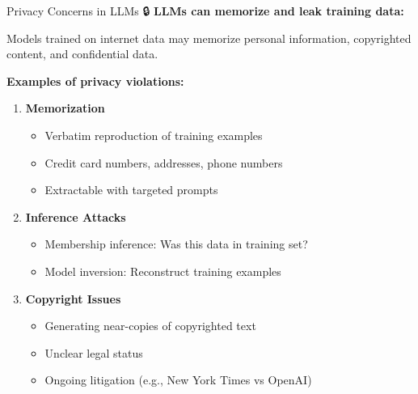 \documentclass[aspectratio=169]{beamer}
\begin{document}
\begin{frame}[shrink=10]{Privacy Concerns in LLMs 🔒}
\textbf{LLMs can memorize and leak training data:}

\vspace{0.5em}

\begin{warningbox}
Models trained on internet data may memorize personal information, copyrighted content, and confidential data.
\end{warningbox}

\vspace{0.5em}

\textbf{Examples of privacy violations:}
\begin{enumerate}\setlength{\itemsep}{0pt}
    \item \textbf{Memorization}
    \begin{itemize}\setlength{\itemsep}{0pt}
        \item Verbatim reproduction of training examples
        \item Credit card numbers, addresses, phone numbers
        \item Extractable with targeted prompts
    \end{itemize}

    \item \textbf{Inference Attacks}
    \begin{itemize}\setlength{\itemsep}{0pt}
        \item Membership inference: Was this data in training set?
        \item Model inversion: Reconstruct training examples
    \end{itemize}

    \item \textbf{Copyright Issues}
    \begin{itemize}\setlength{\itemsep}{0pt}
        \item Generating near-copies of copyrighted text
        \item Unclear legal status
        \item Ongoing litigation (e.g., New York Times vs OpenAI)
    \end{itemize}
\end{enumerate}
\end{frame}
\end{document}
